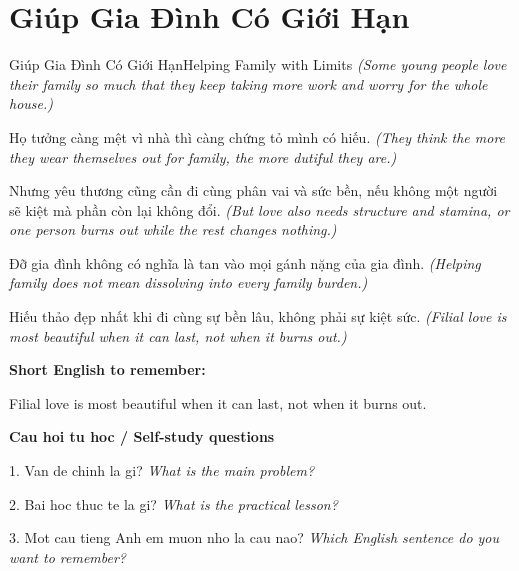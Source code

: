 \section{Giúp Gia Đình Có Giới Hạn}
\begin{truyen}{Giúp Gia Đình Có Giới Hạn}{Helping Family with Limits}
\textit{(Some young people love their family so much that they keep taking more work and worry for the whole house.)}

Họ tưởng càng mệt vì nhà thì càng chứng tỏ mình có hiếu.
\textit{(They think the more they wear themselves out for family, the more dutiful they are.)}

Nhưng yêu thương cũng cần đi cùng phân vai và sức bền, nếu không một người sẽ kiệt mà phần còn lại không đổi.
\textit{(But love also needs structure and stamina, or one person burns out while the rest changes nothing.)}

Đỡ gia đình không có nghĩa là tan vào mọi gánh nặng của gia đình.
\textit{(Helping family does not mean dissolving into every family burden.)}

\end{truyen}

\begin{baihoc}
Hiếu thảo đẹp nhất khi đi cùng sự bền lâu, không phải sự kiệt sức.
\textit{(Filial love is most beautiful when it can last, not when it burns out.)}
\end{baihoc}

\begin{ghinhoanh}
\textbf{Short English to remember:}

Filial love is most beautiful when it can last, not when it burns out.

\end{ghinhoanh}

\begin{tuhocnhanh}
\textbf{Cau hoi tu hoc / Self-study questions}

1. Van de chinh la gi? \textit{What is the main problem?}

2. Bai hoc thuc te la gi? \textit{What is the practical lesson?}

3. Mot cau tieng Anh em muon nho la cau nao? \textit{Which English sentence do you want to remember?}
\end{tuhocnhanh}
\ngancach

